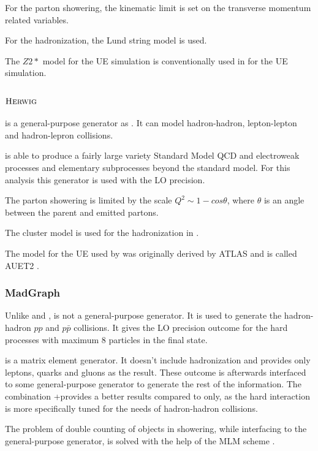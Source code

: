 For the parton showering, the kinematic limit is set on the transverse momentum related variables.

For the hadronization, the Lund string model is used.

The $Z2*$ model for the UE simulation is conventionally used in \PYTHIA for the UE simulation.

\subsubsection{$\textsc{Herwig}$}

\HERWIG \cite{Corcella:2000bw} is a general-purpose generator as \PYTHIA. It can model hadron-hadron, lepton-lepton and hadron-lepron collisions.

\HERWIG is able to produce a fairly large variety Standard Model QCD and electroweak processes and elementary subprocesses beyond the standard model.
For this analysis this generator is used with the LO precision.

The parton showering is limited by the scale $Q^{2} \sim 1 - cos\theta$, where $\theta$ is an angle between the parent and emitted partons.

The cluster model is used for the hadronization in \HERWIG.

The model for the UE used by \HERWIG was originally derived by ATLAS and is called AUET2 \cite{ATL-PHYS-PUB-2011-009}.

\subsubsection{MadGraph}

Unlike \PYTHIA and \HERWIG, \MG is not a general-purpose generator. It is used to generate the hadron-hadron $pp$ and $p\bar{p}$ collisions.
It gives the LO precision outcome for the hard processes with maximum 8 particles in the final state. 

\MG is a matrix element generator. It doesn't include hadronization and provides only leptons, quarks and gluons as the result. These outcome
is afterwards interfaced to some general-purpose generator to generate the rest of the information. The combination \MG+\PYTHIA provides a better
results compared to \PYTHIA only, as the \MG hard interaction is more specifically tuned for the needs of hadron-hadron collisions. 

The problem of double counting of objects in showering, while interfacing \MG to the general-purpose generator, is solved with the help of the 
MLM scheme \cite{Mrenna:2003if}.

